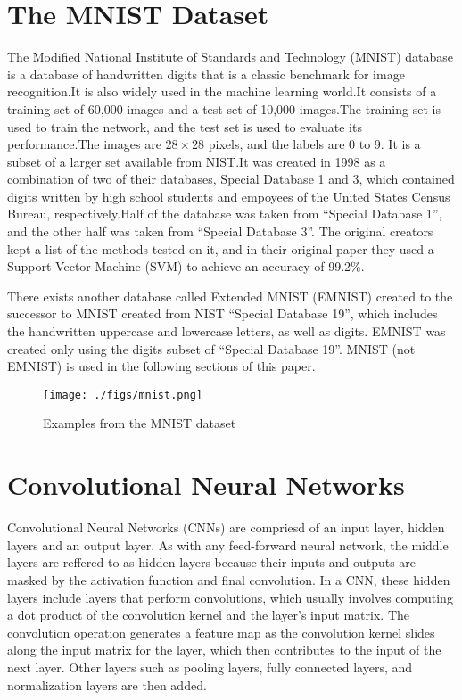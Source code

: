 \documentclass[conference]{IEEEtran}
\begin{document}
\section{The MNIST Dataset}
The Modified National Institute of Standards and Technology (MNIST) database is a database of handwritten digits \cite{6296535} that is a classic benchmark for image recognition.\@ It is also widely used in the machine learning world\cite{Platt1998}.\@ It consists of a training set of 60,000 images and a test set of 10,000 images.\@ The training set is used to train the network, and the test set is used to evaluate its performance.\@ The images are $28 \times 28$ pixels, and the labels are 0 to 9. It is a subset of a larger set available from NIST.\@ It was created in 1998 as a combination of two of their databases, Special Database 1 and 3, which contained digits written by high school students and empoyees of the United States Census Bureau, respectively.\@ Half of the database was taken from ``Special Database 1'', and the other half was taken from ``Special Database 3''. The original creators kept a list of the methods tested on it\cite{726791, mnist}, and in their original paper they used a Support Vector Machine (SVM) to achieve an accuracy of 99.2\%\cite{1265868}.
\par
There exists another database called Extended MNIST (EMNIST) created to the successor to MNIST\cite{emnist} created from NIST ``Special Database 19'', which includes the handwritten uppercase and lowercase letters, as well as digits.\cite{emnist2} EMNIST was created only using the digits subset of ``Special Database 19''. MNIST (not EMNIST) is used in the following sections of this paper.\@

\begin{figure}[!htp]
    \texttt{[image: ./figs/mnist.png]}
    \caption{Examples from the MNIST dataset}\label{fig:mnist}
\end{figure}

\section{Convolutional Neural Networks}\label{sec:cnn}
Convolutional Neural Networks (CNNs) are compriesd of an input layer, hidden layers and an output layer. As with any feed-forward neural network, the middle layers are reffered to as hidden layers because their inputs and outputs are masked by the activation function and final convolution. In a CNN, these hidden layers include layers that perform convolutions, which usually involves computing a dot product of the convolution kernel and the layer's input matrix. The convolution operation generates a feature map as the convolution kernel slides along the input matrix for the layer, which then contributes to the input of the next layer. Other layers such as pooling layers, fully connected layers, and normalization layers are then added.
\end{document}
